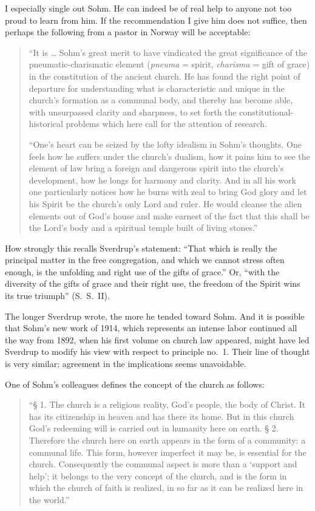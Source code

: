 I especially single out Sohm. He can indeed be of real help to anyone not too proud to learn from him. If the recommendation I give him does not suffice, then perhaps the following from a pastor in Norway will be acceptable:

\begin{quote}
``It is \ldots{} Sohm's great merit to have vindicated the great significance of the pneumatic-charismatic element (\textit{pneuma} = spirit, \textit{charisma} = gift of grace) in the constitution of the ancient church. He has found the right point of departure for understanding what is characteristic and unique in the church’s formation as a communal body, and thereby has become able, with unsurpassed clarity and sharpness, to set forth the constitutional-historical problems which here call for the attention of research.

``One's heart can be seized by the lofty idealism in Sohm's thoughts. One feels how he suffers under the church's dualism, how it pains him to see the element of law bring a foreign and dangerous spirit into the church's development, how he longs for harmony and clarity. And in all his work one particularly notices how he burns with zeal to bring God glory and let his Spirit be the church's only Lord and ruler. He would cleanse the alien elements out of God's house and make earnest of the fact that this shall be the Lord's body and a spiritual temple built of living stones.''
\end{quote}

How strongly this recalls Sverdrup's statement: ``That which is really the principal matter in the free congregation, and which we cannot stress often enough, is the unfolding and right use of the gifts of grace.'' Or, ``with the diversity of the gifts of grace and their right use, the freedom of the Spirit wins its true triumph'' (S.~S.~II).

The longer Sverdrup wrote, the more he tended toward Sohm. And it is possible that Sohm's new work of 1914, which represents an intense labor continued all the way from 1892, when his first volume on church law appeared, might have led Sverdrup to modify his view with respect to principle no.~1. Their line of thought is very similar; agreement in the implications seems unavoidable.

One of Sohm's colleagues defines the concept of the church as follows:

\begin{quote}
``§ 1. The church is a religious reality, God's people, the body of Christ. It has its citizenship in heaven and has there its home. But in this church God's redeeming will is carried out in humanity here on earth. § 2. Therefore the church here on earth appears in the form of a community: a communal life. This form, however imperfect it may be, is essential for the church. Consequently the communal aspect is more than a `support and help'; it belongs to the very concept of the church, and is the form in which the church of faith is realized, in so far as it can be realized here in the world.''
\end{quote}

